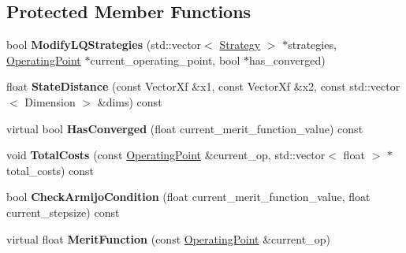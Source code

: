 \subsection*{Protected Member Functions}
\begin{DoxyCompactItemize}
\item 
bool {\bfseries Modify\+L\+Q\+Strategies} (std\+::vector$<$ \hyperlink{structilqgames_1_1_strategy}{Strategy} $>$ $\ast$strategies, \hyperlink{structilqgames_1_1_operating_point}{Operating\+Point} $\ast$current\+\_\+operating\+\_\+point, bool $\ast$has\+\_\+converged)\hypertarget{classilqgames_1_1_i_l_q_solver_ac2d4f1fda81dec233cc881d0092fe37a}{}\label{classilqgames_1_1_i_l_q_solver_ac2d4f1fda81dec233cc881d0092fe37a}

\item 
float {\bfseries State\+Distance} (const Vector\+Xf \&x1, const Vector\+Xf \&x2, const std\+::vector$<$ Dimension $>$ \&dims) const \hypertarget{classilqgames_1_1_i_l_q_solver_aee7f2cfccde0664200d62f92ed5e0606}{}\label{classilqgames_1_1_i_l_q_solver_aee7f2cfccde0664200d62f92ed5e0606}

\item 
virtual bool {\bfseries Has\+Converged} (float current\+\_\+merit\+\_\+function\+\_\+value) const \hypertarget{classilqgames_1_1_i_l_q_solver_a3a179c3f6bb207a0e9c7f995649d4e7d}{}\label{classilqgames_1_1_i_l_q_solver_a3a179c3f6bb207a0e9c7f995649d4e7d}

\item 
void {\bfseries Total\+Costs} (const \hyperlink{structilqgames_1_1_operating_point}{Operating\+Point} \&current\+\_\+op, std\+::vector$<$ float $>$ $\ast$total\+\_\+costs) const \hypertarget{classilqgames_1_1_i_l_q_solver_acf0f45f07d5484a9a60b3a2e1db1647a}{}\label{classilqgames_1_1_i_l_q_solver_acf0f45f07d5484a9a60b3a2e1db1647a}

\item 
bool {\bfseries Check\+Armijo\+Condition} (float current\+\_\+merit\+\_\+function\+\_\+value, float current\+\_\+stepsize) const \hypertarget{classilqgames_1_1_i_l_q_solver_a588b7fa207a616ccb30cde5d41ddad6b}{}\label{classilqgames_1_1_i_l_q_solver_a588b7fa207a616ccb30cde5d41ddad6b}

\item 
virtual float {\bfseries Merit\+Function} (const \hyperlink{structilqgames_1_1_operating_point}{Operating\+Point} \&current\+\_\+op)\hypertarget{classilqgames_1_1_i_l_q_solver_af7c6030e72d5d886f55dbf5792206016}{}\label{classilqgames_1_1_i_l_q_solver_af7c6030e72d5d886f55dbf5792206016}


\end{DoxyCompactItemize}
